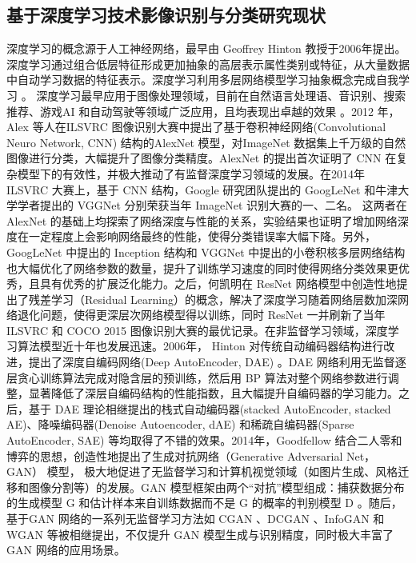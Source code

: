 \subsection{基于深度学习技术影像识别与分类研究现状}
\label{subsec:1-2-2}
深度学习的概念源于人工神经网络，最早由 Geoffrey Hinton \cite{hinton2006fast} 教授于2006年提出。深度学习通过组合低层特征形成更加抽象的高层表示属性类别或特征，从大量数据中自动学习数据的特征表示。深度学习利用多层网络模型学习抽象概念完成自我学习 \cite{lecun2015deep}。 深度学习最早应用于图像处理领域，目前在自然语言处理语、音识别、搜索推荐、游戏AI 和自动驾驶等领域广泛应用，且均表现出卓越的效果 \cite{bengio2009learning}。2012 年，Alex 等人在ILSVRC 图像识别大赛中提出了基于卷积神经网络(Convolutional Neuro Network, CNN) 结构的AlexNet \cite{NIPS2012_4824} 模型，对ImageNet 数据集上千万级的自然图像进行分类，大幅提升了图像分类精度。AlexNet 的提出首次证明了 CNN 在复杂模型下的有效性，并极大推动了有监督深度学习领域的发展。在2014年 ILSVRC 大赛上，基于 CNN 结构，Google 研究团队提出的 GoogLeNet \cite{szegedy2015going} 和牛津大学学者提出的 VGGNet \cite{simonyan2014very} 分别荣获当年 ImageNet 识别大赛的一、二名。 这两者在 AlexNet 的基础上均探索了网络深度与性能的关系，实验结果也证明了增加网络深度在一定程度上会影响网络最终的性能，使得分类错误率大幅下降。另外，GoogLeNet 中提出的 Inception 结构和 VGGNet 中提出的小卷积核多层网络结构也大幅优化了网络参数的数量，提升了训练学习速度的同时使得网络分类效果更优秀，且具有优秀的扩展泛化能力。之后，何凯明在 ResNet \cite{he2016deep} 网络模型中创造性地提出了残差学习（Residual Learning）的概念，解决了深度学习随着网络层数加深网络退化问题，使得更深层次网络模型得以训练，同时 ResNet 一并刷新了当年 ILSVRC 和 COCO 2015 图像识别大赛的最优记录。在非监督学习领域，深度学习算法模型近十年也发展迅速。2006年， Hinton 对传统自动编码器结构进行改进，提出了深度自编码网络(Deep AutoEncoder, DAE) \cite{hinton2006fast}。DAE 网络利用无监督逐层贪心训练算法完成对隐含层的预训练，然后用 BP 算法对整个网络参数进行调整，显著降低了深层自编码结构的性能指数，且大幅提升自编码器的学习能力。之后，基于 DAE 理论相继提出的栈式自动编码器(stacked AutoEncoder, stacked AE)\cite{bengio2007greedy}、降噪编码器(Denoise Autoencoder, dAE)\cite{vincent2008extracting} 和稀疏自编码器(Sparse AutoEncoder, SAE)\cite{ng2011sparse} 等均取得了不错的效果。2014年，Goodfellow 结合二人零和博弈的思想，创造性地提出了生成对抗网络（Generative Adversarial Net，GAN）\cite{goodfellow2014generative} 模型， 极大地促进了无监督学习和计算机视觉领域（如图片生成、风格迁移和图像分割等）的发展。GAN 模型框架由两个“对抗”模型组成：捕获数据分布的生成模型 G 和估计样本来自训练数据而不是 G 的概率的判别模型 D 。随后，基于GAN 网络的一系列无监督学习方法如 CGAN\cite{mirza2014conditional} 、DCGAN \cite{radford2015unsupervised} 、InfoGAN \cite{chen2016infogan} 和 WGAN \cite{arjovsky2017wasserstein} 等被相继提出，不仅提升 GAN 模型生成与识别精度，同时极大丰富了GAN 网络的应用场景。

